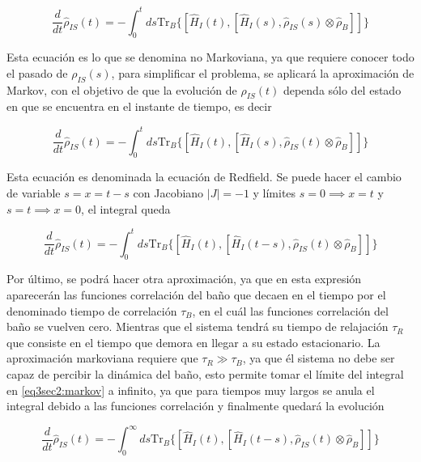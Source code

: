 \begin{equation}
    \frac{d}{dt}\hat{\rho}_{IS}(t) = -  \int_{0}^{t}ds \text{Tr}_{B}\{[\hat{H}_{I}(t), [\hat{H}_{I}(s),\hat{\rho}_{IS}(s) \otimes \hat{\rho}_{B}]]\}
\end{equation} 

Esta ecuación es lo que se denomina no Markoviana, ya que requiere conocer todo el pasado de $\rho_{IS}(s)$, para simplificar el problema, se aplicará la aproximación de Markov, con el objetivo de que la evolución de $\hat{\rho}_{IS}(t)$ dependa sólo del estado en que se encuentra en el instante de tiempo, es decir

\begin{equation*}
    \frac{d}{dt}\hat{\rho}_{IS}(t) = -  \int_{0}^{t}ds \text{Tr}_{B}\{[\hat{H}_{I}(t), [\hat{H}_{I}(s),\hat{\rho}_{IS}(t) \otimes \hat{\rho}_{B}]]\}
\end{equation*} 

Esta ecuación es denominada la ecuación de Redfield. Se puede hacer el cambio de variable $s= x = t-s$ con Jacobiano $|J| = -1$ y límites $s=0 \implies x = t$ y $s=t \implies x = 0$, el integral queda

\begin{equation}
    \frac{d}{dt}\hat{\rho}_{IS}(t) = -  \int_{0}^{t}ds \text{Tr}_{B}\{[\hat{H}_{I}(t), [\hat{H}_{I}(t-s),\hat{\rho}_{IS}(t) \otimes \hat{\rho}_{B}]]\}
    \label{eq3sec2:markov}
\end{equation} 

Por último, se podrá hacer otra aproximación, ya que en esta expresión aparecerán las funciones correlación del baño que decaen en el tiempo por el denominado tiempo de correlación $\tau_{B}$, en el cuál las funciones correlación del baño se vuelven cero. Mientras que el sistema tendrá su tiempo de relajación $\tau_{R}$ que consiste en el tiempo que demora en llegar a su estado estacionario. La aproximación markoviana requiere que $\tau_{R}\gg \tau_{B}$, ya que él sistema no debe ser capaz de percibir la dinámica del baño, esto permite tomar el límite del integral en \ref{eq3sec2:markov} a infinito, ya que para tiempos muy largos se anula el integral debido a las funciones correlación y finalmente quedará la evolución

\begin{equation}
    \frac{d}{dt}\hat{\rho}_{IS}(t) = -  \int_{0}^{\infty}ds \text{Tr}_{B}\{[\hat{H}_{I}(t), [\hat{H}_{I}(t-s),\hat{\rho}_{IS}(t) \otimes \hat{\rho}_{B}]]\}
    \label{eq3sec2:markov1}
\end{equation} 

